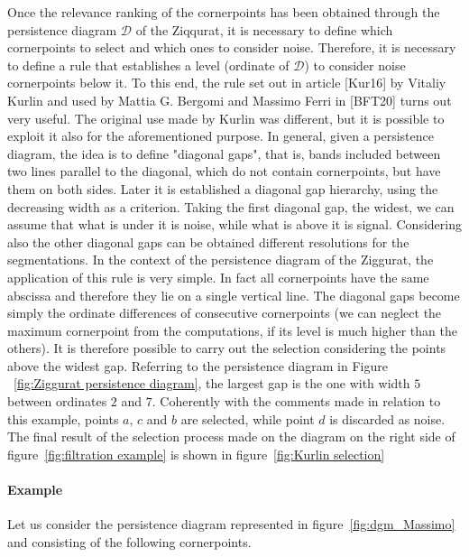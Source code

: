 \documentclass[english, LaM, oneside, noexaminfo]{sapthesis}
\begin{document}
Once the relevance ranking of the cornerpoints has been obtained through the persistence diagram $\mathcal{D}$ of the Ziqqurat, it is necessary to define which cornerpoints to select
and which ones to consider  noise. Therefore, it is necessary to define a rule that establishes a level (ordinate of $\mathcal{D}$)  to consider noise cornerpoints below it. To this end, the rule set out in article [Kur16] by Vitaliy Kurlin and used by Mattia G. Bergomi and Massimo Ferri in [BFT20] turns out very useful. The original use made by Kurlin was different, but it is possible to exploit it also for the aforementioned purpose. In general, given a persistence diagram, the idea is to define "diagonal gaps", that is, bands
included between two lines parallel to the diagonal, which do not contain cornerpoints,
but  have them on both sides. Later it is established a
diagonal gap hierarchy, using the decreasing width as a criterion.
Taking the first diagonal gap, the widest, we can assume that what is
under it is noise, while what is above it is signal. Considering
also the other diagonal gaps can be obtained different resolutions for the
segmentations.
In the context of the persistence diagram  of the Ziggurat, the application
of this rule is very simple. In fact all cornerpoints have the same
abscissa and therefore they lie on a single vertical line. The diagonal gaps become
simply the ordinate differences of consecutive cornerpoints
(we can neglect the maximum cornerpoint from the computations, if its level is much higher than the others). It is therefore possible to carry out
the selection considering the points above the widest gap.
Referring to the persistence diagram in Figure ~\ref{fig:Ziggurat persistence diagram}, the largest gap
is the one with width $5$ between ordinates $2$ and $7$. Coherently with the comments made
in relation to this example, points $a$, $c$ and $b$ are selected, while 
point $d$ is discarded as noise. The final result of the selection process made on the diagram on the right side of figure~\ref{fig:filtration example}  is shown in figure~\ref{fig:Kurlin selection}


\paragraph{Example}

\label{Example 2}

Let us consider the persistence diagram represented in figure~\ref{fig:dgm_Massimo} and consisting of the following cornerpoints.
\end{document}
